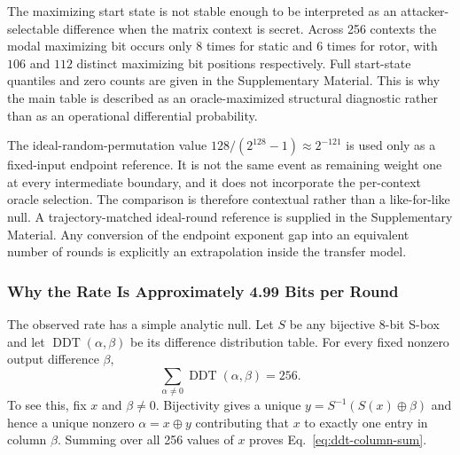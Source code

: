 \documentclass[cryptography,article,submit,oneauthor]{Definitions/mdpi}
\begin{document}
The maximizing start state is not stable enough to be interpreted as an attacker-selectable difference when the matrix context is secret. Across 256 contexts the modal maximizing bit occurs only $8$ times for static and $6$ times for rotor, with $106$ and $112$ distinct maximizing bit positions respectively. Full start-state quantiles and zero counts are given in the Supplementary Material. This is why the main table is described as an oracle-maximized structural diagnostic rather than as an operational differential probability.

The ideal-random-permutation value $128/(2^{128}-1)\approx2^{-121}$ is used only as a fixed-input endpoint reference. It is not the same event as remaining weight one at every intermediate boundary, and it does not incorporate the per-context oracle selection. The comparison is therefore contextual rather than a like-for-like null. A trajectory-matched ideal-round reference is supplied in the Supplementary Material. Any conversion of the endpoint exponent gap into an equivalent number of rounds is explicitly an extrapolation inside the transfer model.

\subsubsection{Why the Rate Is Approximately 4.99 Bits per Round}\label{sec:3-7-rate}
The observed rate has a simple analytic null. Let $S$ be any bijective 8-bit S-box and let $\operatorname{DDT}(\alpha,\beta)$ be its difference distribution table. For every fixed nonzero output difference $\beta$,
\begin{equation}
\sum_{\alpha\ne0}\operatorname{DDT}(\alpha,\beta)=256.
\label{eq:ddt-column-sum}
\end{equation}
To see this, fix $x$ and $\beta\ne0$. Bijectivity gives a unique $y=S^{-1}(S(x)\oplus\beta)$ and hence a unique nonzero $\alpha=x\oplus y$ contributing that $x$ to exactly one entry in column $\beta$. Summing over all 256 values of $x$ proves Eq.~\eqref{eq:ddt-column-sum}.
\end{document}
